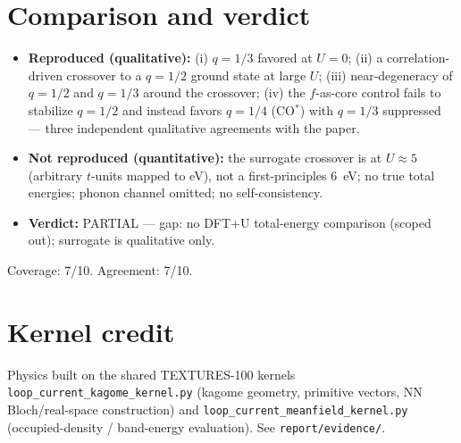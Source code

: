 \documentclass[11pt]{article}
\begin{document}
\section{Comparison and verdict}
\begin{itemize}
\item \textbf{Reproduced (qualitative):} (i) $q=1/3$ favored at $U=0$; (ii) a
correlation-driven crossover to a $q=1/2$ ground state at large $U$; (iii)
near-degeneracy of $q=1/2$ and $q=1/3$ around the crossover; (iv) the $f$-as-core
control fails to stabilize $q=1/2$ and instead favors $q=1/4$ (CO$^*$) with
$q=1/3$ suppressed --- three independent qualitative agreements with the paper.
\item \textbf{Not reproduced (quantitative):} the surrogate crossover is at
$U\!\approx\!5$ (arbitrary $t$-units mapped to eV), not a first-principles $6$~eV;
no true total energies; phonon channel omitted; no self-consistency.
\item \textbf{Verdict:} PARTIAL --- gap: no DFT+U total-energy comparison
(scoped out); surrogate is qualitative only.
\end{itemize}
Coverage: 7/10. Agreement: 7/10.

\section{Kernel credit}
Physics built on the shared TEXTURES-100 kernels
\texttt{loop\_current\_kagome\_kernel.py} (kagome geometry, primitive vectors,
NN Bloch/real-space construction) and
\texttt{loop\_current\_meanfield\_kernel.py} (occupied-density / band-energy
evaluation). See \texttt{report/evidence/}.
\end{document}
